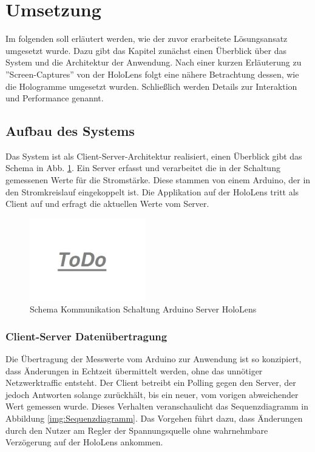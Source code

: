 \section{Umsetzung}
\label{sec-5}

Im folgenden soll erläutert werden, wie der zuvor erarbeitete Lösungsansatz umgesetzt wurde. Dazu gibt das Kapitel zunächst einen Überblick über das System und die Architektur der Anwendung. Nach einer kurzen Erläuterung zu ''Screen-Captures'' von der HoloLens folgt eine nähere Betrachtung dessen, wie die Hologramme umgesetzt wurden. Schließlich werden Details zur Interaktion und Performance genannt.

\subsection{Aufbau des Systems}
\label{sec-5-1}
Das System ist als Client-Server-Architektur realisiert, einen Überblick gibt das Schema in Abb. \ref{img:communication-schema}. Ein Server erfasst und verarbeitet die in der Schaltung gemessenen Werte für die Stromstärke. Diese stammen von einem Arduino, der in den Stromkreislauf eingekoppelt ist. Die Applikation auf der HoloLens tritt als Client auf und erfragt die aktuellen Werte vom Server. 
\begin{figure}[H]
	\centering
	\includegraphics[width=0.45\textwidth]{images/todo.jpg}
	\caption{Schema Kommunikation Schaltung Arduino Server HoloLens}
	\label{img:communication-schema}
\end{figure}

\subsubsection{Client-Server Datenübertragung}
\label{sec-5-1-1}
Die Übertragung der Messwerte vom Arduino zur Anwendung ist so konzipiert, dass Änderungen in Echtzeit übermittelt werden, ohne das unnötiger Netzwerktraffic entsteht. Der Client betreibt ein Polling gegen den Server, der jedoch Antworten solange zurückhält, bis ein neuer, vom vorigen abweichender Wert gemessen wurde. Dieses Verhalten veranschaulicht das Sequenzdiagramm in Abbildung \ref{img:Sequenzdiagramm}. Das Vorgehen führt dazu, dass Änderungen durch den Nutzer am Regler der Spannungsquelle ohne wahrnehmbare Verzögerung auf der HoloLens ankommen.


